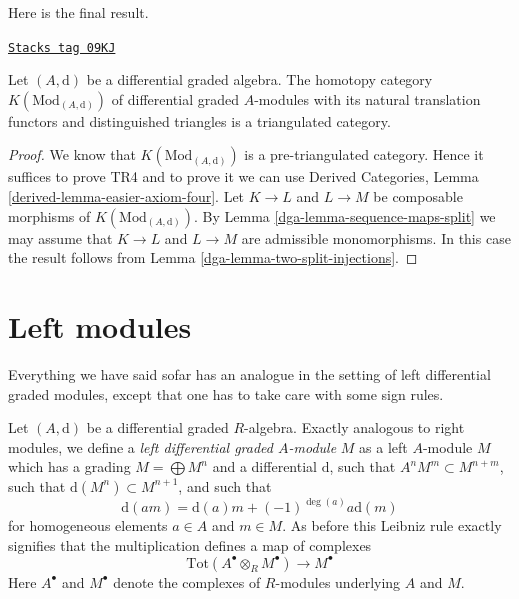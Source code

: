 Here is the final result.

\begin{proposition}
\label{dga-proposition-homotopy-category-triangulated}
\href{https://stacks.math.columbia.edu/tag/09KJ}{\texttt{Stacks tag 09KJ}}

Let $(A, \text{d})$ be a differential graded algebra. The homotopy category
$K(\text{Mod}_{(A, \text{d})})$ of differential graded $A$-modules with its
natural translation functors and distinguished triangles is a triangulated
category.
\end{proposition}

\begin{proof}

We know that $K(\text{Mod}_{(A, \text{d})})$ is a pre-triangulated category.
Hence it suffices to prove TR4 and to prove it we can use
Derived Categories, Lemma \ref{derived-lemma-easier-axiom-four}.
Let $K \to L$ and $L \to M$ be composable morphisms of
$K(\text{Mod}_{(A, \text{d})})$. By
Lemma \ref{dga-lemma-sequence-maps-split} we may assume that
$K \to L$ and $L \to M$ are admissible monomorphisms.
In this case the result follows from
Lemma \ref{dga-lemma-two-split-injections}.
\end{proof}

\section{Left modules}
\label{dga-section-left-modules}
Everything we have said sofar has an analogue in the setting
of left differential graded modules, except that one has to
take care with some sign rules.

\medskip\noindent
Let $(A, \text{d})$ be a differential graded $R$-algebra.
Exactly analogous to right modules, we define a
{\it left differential graded $A$-module} $M$ as a left
$A$-module $M$ which has a grading $M = \bigoplus M^n$
and a differential $\text{d}$, such that $A^n M^m \subset M^{n + m}$,
such that $\text{d}(M^n) \subset M^{n + 1}$, and such that
$$
\text{d}(am) = \text{d}(a) m + (-1)^{\deg(a)}a \text{d}(m)
$$
for homogeneous elements $a \in A$ and $m \in M$. As before this
Leibniz rule exactly signifies that the multiplication defines
a map of complexes
$$
\text{Tot}(A^\bullet \otimes_R M^\bullet) \to M^\bullet
$$
Here $A^\bullet$ and $M^\bullet$ denote the complexes of $R$-modules
underlying $A$ and $M$.

